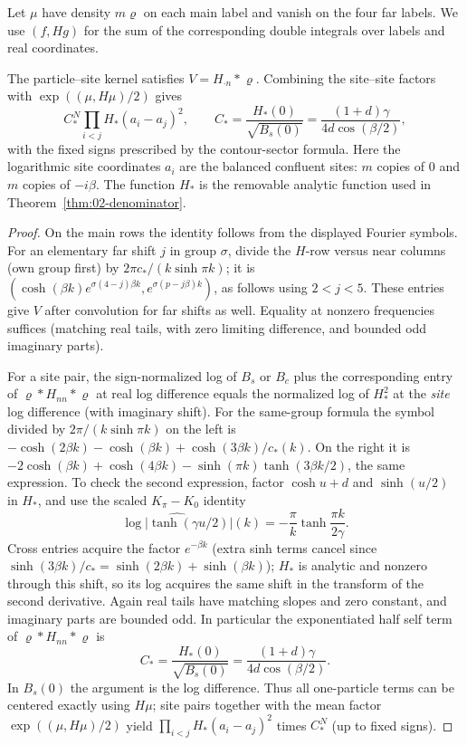 Let \(\mu\) have density \(m\varrho\) on each main label and vanish
on the four far labels. We use \((f,Hg)\) for the sum of the
corresponding double integrals over labels and real coordinates.

\begin{lemma}\label{lem:03-centering}\label{E:centering}
The particle--site kernel satisfies \(V=H_{\cdot n}*\varrho\).
Combining the site--site factors with
\(\exp((\mu,H\mu)/2)\) gives
\[
 C_*^N\prod_{i<j}H_*(a_i-a_j)^2,\qquad
 C_*=\frac{H_*(0)}{\sqrt{B_s(0)}}
     =\frac{(1+d)\gamma}{4d\cos(\beta/2)},
\]
with the fixed signs prescribed by the contour-sector formula.
Here the logarithmic site coordinates \(a_i\) are the balanced confluent sites: \(m\) copies of \(0\) and \(m\) copies of \(-i\beta\). The function \(H_*\) is the removable analytic function used in Theorem~\ref{thm:02-denominator}.
\end{lemma}
\begin{proof}
On the main rows the identity follows from the displayed Fourier symbols. For an elementary far shift \(j\) in group \(\sigma\), divide the \(H\)-row versus near columns (own group first) by \(2\pi c_*/(k\sinh\pi k)\); it is
\((\cosh(\beta k)e^{\sigma(4-j)\beta k},e^{\sigma(p-j\beta)k})\), as follows using \(2<j<5\). These entries give \(V\) after convolution for far shifts as well. Equality at nonzero frequencies suffices (matching real tails, with zero limiting difference, and bounded odd imaginary parts).

For a site pair, the sign-normalized log of \(B_s\) or \(B_c\) plus the corresponding entry of \(\varrho*H_{nn}*\varrho\) at real log difference equals the normalized log of \(H_*^2\) at the \emph{site} log difference (with imaginary shift). For the same-group formula the symbol divided by \(2\pi/(k\sinh\pi k)\) on the left is
\(-\cosh(2\beta k)-\cosh(\beta k)+\cosh(3\beta k)/c_*(k)\).
On the right it is \(-2\cosh(\beta k)+\cosh(4\beta k)-\sinh(\pi k)\tanh(3\beta k/2)\), the same expression. To check the second expression, factor \(\cosh u+d\) and \(\sinh(u/2)\) in \(H_*\), and use the scaled \(K_\pi-K_0\) identity
\[
 \widehat{\log|\tanh(\gamma u/2)|}(k)
       =-\frac{\pi}{k}\tanh\frac{\pi k}{2\gamma}.
\] Cross entries acquire the factor \(e^{-\beta k}\) (extra sinh terms cancel since \(\sinh(3\beta k)/c_*=\sinh(2\beta k)+\sinh(\beta k)\)); \(H_*\) is analytic and nonzero through this shift, so its log acquires the same shift in the transform of the second derivative. Again real tails have matching slopes and zero constant, and imaginary parts are bounded odd. In particular the exponentiated half self term of \(\varrho*H_{nn}*\varrho\) is
\[
 C_*=\frac{H_*(0)}{\sqrt{B_s(0)}}=\frac{(1+d)\gamma}{4d\cos(\beta/2)} .
\]
In \(B_s(0)\) the argument is the log difference. Thus all one-particle terms can be centered exactly using \(H\mu\); site pairs together with the mean factor \(\exp((\mu,H\mu)/2)\) yield \(\prod_{i<j}H_*(a_i-a_j)^2\) times \(C_*^N\) (up to fixed signs).

\end{proof}

